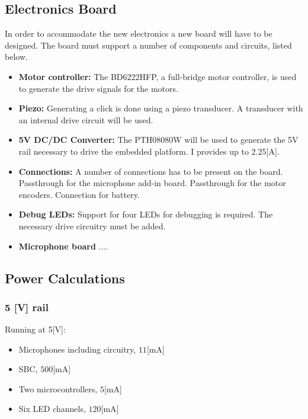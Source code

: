 \documentclass[11pt]{article}
\begin{document}
\subsection{Electronics Board} %
\label{sub:electronics_board}
In order to accommodate the new electronics a new board will have to be designed.
The board must support a number of components and circuits, listed below.
\begin{itemize}
	\item \textbf{Motor controller:} The BD6222HFP, a full-bridge motor controller, is used to generate the drive signals for the motors.
	\item \textbf{Piezo:} Generating a click is done using a piezo transducer.
	A transducer with an internal drive circuit will be used.
	\item \textbf{5V DC/DC Converter:} The PTH08080W will be used to generate the 5V rail necessary to drive the embedded platform. I provides up to 2.25[A].
	\item \textbf{Connections:} A number of connections has to be present on the board.
	Passthrough for the microphone add-in board.
	Passthrough for the motor encoders.
	Connection for battery.
	\item \textbf{Debug LEDs:} Support for four LEDs for debugging is required.
	The necessary drive circuitry must be added.
	\item \textbf{Microphone board} ....
\end{itemize}


\subsection{Power Calculations} %
\label{sub:power_calculations}

\subsubsection{5 [V] rail} %

Running at 5[V]:
\begin{itemize}
	\item Microphones including circuitry, $11$[mA]
	\item SBC, $500$[mA]
	\item Two microcontrollers, $5$[mA]
	\item Six LED channels, $120$[mA]
\end{itemize}
\end{document}
